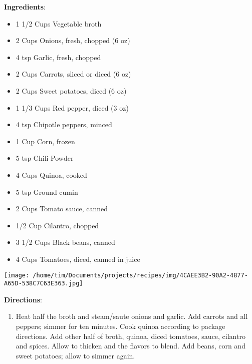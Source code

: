 \documentclass[11pt, twoside, openany]{book}
\begin{document}
\begin{minipage}[t]{0.8\linewidth}
\textbf{Ingredients}:\vspace{-3mm}
\begin{multicols}{2}
\begin{itemize}\setlength\itemsep{-1mm}
\item 1 1/2 Cups Vegetable broth
\item 2 Cups Onions, fresh, chopped (6 oz)
\item 4 tsp Garlic, fresh, chopped
\item 2 Cups Carrots, sliced or diced (6 oz)
\item 2 Cups Sweet potatoes, diced (6 oz)
\item 1 1/3 Cups Red pepper, diced (3 oz)
\item 4 tsp Chipotle peppers, minced
\item 1 Cup Corn, frozen
\item 5 tsp Chili Powder
\item 4 Cups Quinoa, cooked
\item 5 tsp Ground cumin
\item 2 Cups Tomato sauce, canned
\item 1/2 Cup Cilantro, chopped
\item 3 1/2 Cups Black beans, canned
\item 4 Cups Tomatoes, diced, canned in juice
\end{itemize}
\end{multicols}
\end{minipage}
\begin{minipage}[t]{0.2\linewidth}
\centering \strut\vspace*{-\baselineskip}\newline
\texttt{[image: /home/tim/Documents/projects/recipes/img/4CAEE3B2-90A2-4877-A65D-538C7C63E363.jpg]}\\
\end{minipage}\vspace{3mm}
\textbf{Directions}:
\vspace{-3mm}\begin{enumerate}\setlength\itemsep{-1mm}
\item Heat half the broth and steam/saute onions and garlic. Add carrots and all peppers; simmer for ten minutes. Cook quinoa according to package directions. Add other half of broth, quinoa, diced tomatoes, sauce, cilantro and spices. Allow to thicken and the flavors to blend. Add beans, corn and sweet potatoes; allow to simmer again.
\end{enumerate}
\end{document}

